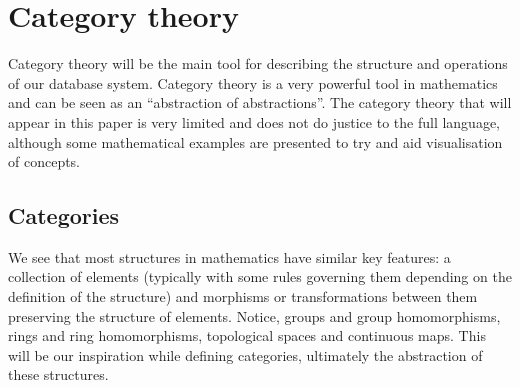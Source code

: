 \section{Category theory}
Category theory will be the main tool for describing the structure and operations
of our database system. Category theory is a very powerful tool in mathematics
and can be seen as an ``abstraction of abstractions''. The category theory that
will appear in this paper is very limited and does not do justice to the full
language, although some mathematical examples are presented to try and aid
visualisation of concepts.

\subsection{Categories}
\theoremstyle{definition}\newtheorem*{categorydef}{Category}
We see that most structures in mathematics have similar key features: a
collection of elements (typically with some rules governing them depending on
the definition of the structure) and morphisms or transformations between them
preserving the structure of elements. Notice, groups and group homomorphisms,
rings and ring homomorphisms, topological spaces and continuous maps. This will
be our inspiration while defining categories, ultimately the abstraction of
these structures. 
